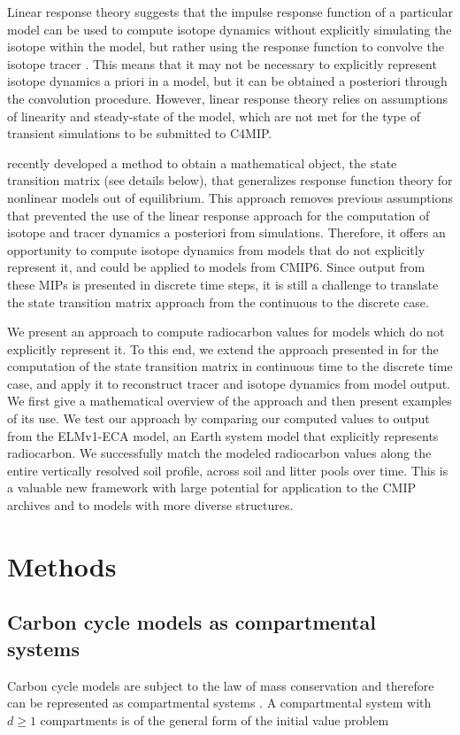 \documentclass[11pt,a4paper]{article}
\begin{document}
Linear response theory suggests that the impulse response function of a particular model can be used to compute isotope dynamics without explicitly simulating the isotope within the model, but rather using the response function to convolve the isotope tracer \citep{Thompson1999}. This means that it may not be necessary to explicitly represent isotope dynamics a priori in a model, but it can be obtained a posteriori through the convolution procedure. However, linear response theory relies on assumptions of linearity and steady-state of the model, which are not met for the type of transient simulations to be submitted to C4MIP. 

\citet{Metzler2018PNAS} recently developed a method to obtain a mathematical object, the state transition matrix (see details below), that generalizes response function theory for nonlinear models out of equilibrium. This approach removes previous assumptions that prevented the use of the linear response approach for the computation of isotope and tracer dynamics a posteriori from simulations. Therefore, it offers an opportunity to compute isotope dynamics from models that do not explicitly represent it, and could be applied to models from CMIP6. Since output from these MIPs is presented in discrete time steps, it is still a challenge to translate the state transition matrix approach from the continuous to the discrete case.

We present an approach to compute radiocarbon values for models which do not explicitly represent it. To this end, we extend the approach presented in \citet{Metzler2018PNAS} for the computation of the state transition matrix in continuous time to the discrete time case, and apply it to reconstruct tracer and isotope dynamics from model output. We first give a mathematical overview of the approach and then present examples of its use. We test our approach by comparing our computed values to output from the ELMv1-ECA model, an Earth system model that explicitly represents radiocarbon. We successfully match the modeled radiocarbon values along the entire vertically resolved soil profile, across soil and litter pools over time. This is a valuable new framework with large potential for application to the CMIP archives and to models with more diverse structures. 

\section{Methods}
\subsection{Carbon cycle models as compartmental systems}
    Carbon cycle models are subject to the law of mass conservation and therefore can be represented as compartmental systems \citep{Anderson1983, Jacquez1993}.
    A compartmental system with $d\geq1$ compartments is of the general form of the initial value problem
    
\end{document}
